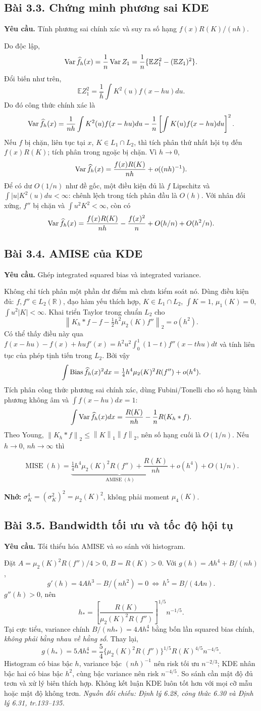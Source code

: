 \documentclass[11pt,a4paper]{article}
\newcommand{\E}{\mathbb E}\newcommand{\Pp}{\mathbb P}
\newcommand{\R}{\mathbb R}\newcommand{\1}{\mathbf 1}
\DeclareMathOperator{\Var}{Var}\DeclareMathOperator{\Cov}{Cov}
\DeclareMathOperator{\Bias}{Bias}\DeclareMathOperator{\MSE}{MSE}
\DeclareMathOperator{\MISE}{MISE}\DeclareMathOperator{\AMISE}{AMISE}
\newcommand{\norm}[1]{\left\lVert#1\right\rVert}
\newcommand{\src}[1]{\textit{Nguồn đối chiếu: #1.}}
\newcommand{\prob}[3]{\subsection{Bài #1. #2}\label{b:#1}\textbf{Yêu cầu.} #3\par}
\begin{document}
\prob{3.3}{Chứng minh phương sai KDE}{Tính phương sai chính xác và suy ra số hạng $f(x)R(K)/(nh)$.}
Do độc lập,
\[
\Var\fh(x)=\frac1n\Var Z_1=\frac1n\{\E Z_1^2-(\E Z_1)^2\}.
\]
Đổi biến như trên,
\[
\E Z_1^2=\frac1h\int K^2(u)f(x-hu)du.
\]
Do đó công thức chính xác là
\[
\Var\fh(x)=\frac1{nh}\int K^2(u)f(x-hu)du-\frac1n\left[\int K(u)f(x-hu)du\right]^2.
\]
Nếu $f$ bị chặn, liên tục tại $x$, $K\in L_1\cap L_2$, thì tích phân thứ nhất hội tụ đến $f(x)R(K)$; tích phân trong ngoặc bị chặn. Vì $h\to0$,
\[
\Var\fh(x)=\frac{f(x)R(K)}{nh}+o((nh)^{-1}).
\]
Để có dư $O(1/n)$ như đề gốc, một điều kiện đủ là $f$ Lipschitz và $\int |u|K^2(u)du<\infty$: chênh lệch trong tích phân đầu là $O(h)$. Với nhân đối xứng, $f''$ bị chặn và $\int u^2K^2<\infty$, còn có
\[
\Var\fh(x)=\frac{f(x)R(K)}{nh}-\frac{f(x)^2}{n}+O(h/n)+O(h^2/n).
\]

\prob{3.4}{AMISE của KDE}{Ghép integrated squared bias và integrated variance.}
Không chỉ tích phân một phần dư điểm mà chưa kiểm soát nó. Dùng điều kiện đủ: $f,f''\in L_2(\R)$, đạo hàm yếu thích hợp, $K\in L_1\cap L_2$, $\int K=1$, $\mu_1(K)=0$, $\int u^2|K|<\infty$. Khai triển Taylor trong chuẩn $L_2$ cho
\[
\norm{K_h*f-f-\tfrac12h^2\mu_2(K)f''}_2=o(h^2).
\]
Có thể thấy điều này qua $f(x-hu)-f(x)+hu f'(x)=h^2u^2\int_0^1(1-t)f''(x-thu)dt$ và tính liên tục của phép tịnh tiến trong $L_2$. Bởi vậy
\[
\int\Bias\fh(x)^2dx=\tfrac14h^4\mu_2(K)^2R(f'')+o(h^4).
\]
Tích phân công thức phương sai chính xác, dùng Fubini/Tonelli cho số hạng bình phương không âm và $\int f(x-hu)dx=1$:
\[
\int\Var\fh(x)dx=\frac{R(K)}{nh}-\frac1nR(K_h*f).
\]
Theo Young, $\norm{K_h*f}_2\le\norm K_1\norm f_2$, nên số hạng cuối là $O(1/n)$. Nếu $h\to0$, $nh\to\infty$ thì
\begin{result}
\[
\MISE(h)=\underbrace{\tfrac14h^4\mu_2(K)^2R(f'')+\frac{R(K)}{nh}}_{\AMISE(h)}
+o(h^4)+O(1/n).
\]
\end{result}
\textbf{Nhớ:} $\sigma_K^4=(\sigma_K^2)^2=\mu_2(K)^2$, không phải moment $\mu_4(K)$.

\prob{3.5}{Bandwidth tối ưu và tốc độ hội tụ}{Tối thiểu hóa AMISE và so sánh với histogram.}
Đặt $A=\mu_2(K)^2R(f'')/4>0$, $B=R(K)>0$. Với $g(h)=Ah^4+B/(nh)$,
\[
g'(h)=4Ah^3-B/(nh^2)=0\ \Longleftrightarrow\ h^5=B/(4An).
\]
$g''(h)>0$, nên
\[
h_* =\left[\frac{R(K)}{\mu_2(K)^2R(f'')}\right]^{1/5}n^{-1/5}.
\]
Tại cực tiểu, variance chính $B/(nh_*)=4Ah_*^4$ bằng bốn lần squared bias chính, \emph{không phải bằng nhau về hằng số}. Thay lại,
\[
g(h_*)=5Ah_*^4=\frac54\{\mu_2(K)^2R(f'')\}^{1/5}R(K)^{4/5}n^{-4/5}.
\]
Histogram có bias bậc $h$, variance bậc $(nh)^{-1}$ nên risk tối ưu $n^{-2/3}$; KDE nhân bậc hai có bias bậc $h^2$, cùng bậc variance nên risk $n^{-4/5}$. So sánh cần mật độ đủ trơn và xử lý biên thích hợp. Không kết luận KDE luôn tốt hơn với mọi cỡ mẫu hoặc mật độ không trơn.
\src{Định lý 6.28, công thức 6.30 và Định lý 6.31, tr.133--135}
\end{document}

